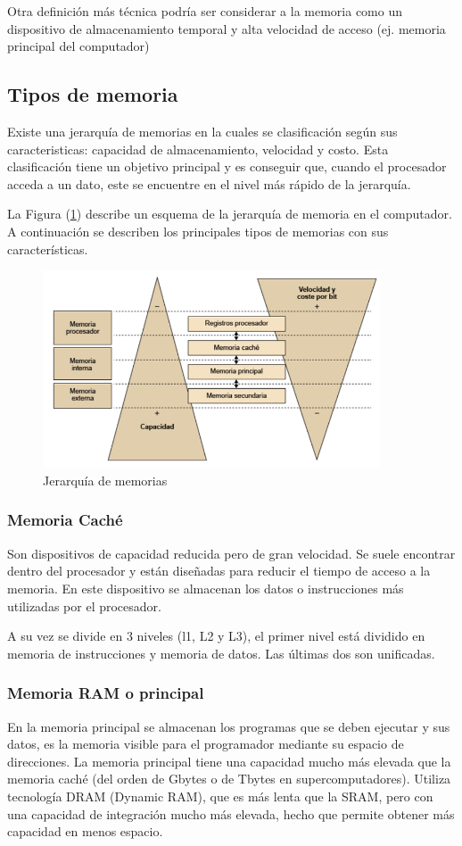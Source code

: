 \documentclass{article}
\begin{document}
Otra definición más técnica podría ser considerar a la memoria como un dispositivo de almacenamiento temporal y alta velocidad de acceso (ej. memoria principal del computador)\cite{Academia}

\subsection{Tipos de memoria}
Existe una jerarquía de memorias en la cuales se clasificación según sus caracteristicas: capacidad de almacenamiento, velocidad y costo. Esta clasificación tiene un objetivo principal y es conseguir que, cuando el procesador acceda a un dato, este se encuentre en el nivel más rápido de la jerarquía.\cite{Estructura}

La Figura (\ref{fig:Jerarquia}) describe un esquema de la jerarquía de memoria en el computador.
A continuación se describen los principales tipos de memorias con sus características.

\begin{figure}[h]
\includegraphics[width=10cm]{Jerarquia.png}
\centering
\caption{Jerarquía de memorias}
\label{fig:Jerarquia}
\end{figure}

\subsubsection{Memoria Caché}
Son dispositivos de capacidad reducida pero de gran velocidad. Se suele encontrar dentro del procesador y están diseñadas para reducir el tiempo de acceso a la memoria. En este dispositivo se almacenan los datos o instrucciones más utilizadas por el procesador. \cite{Estructura}

A su vez se divide en 3 niveles (l1, L2 y L3), el primer nivel está dividido en memoria de instrucciones y memoria de datos. Las últimas dos son unificadas.

\subsubsection{Memoria RAM o principal}
En la memoria principal se almacenan los programas que se deben ejecutar y sus datos, es la memoria visible para el programador mediante su espacio de direcciones.
La memoria principal tiene una capacidad mucho más elevada que la memoria caché (del orden de Gbytes o de Tbytes en supercomputadores). Utiliza tecnología DRAM (Dynamic RAM), que es más lenta que la SRAM, pero con una capacidad de integración mucho más elevada, hecho que permite obtener más capacidad en menos espacio.\cite{Estructura}
\end{document}
